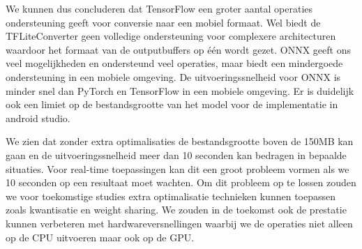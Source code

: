 We kunnen dus concluderen dat TensorFlow een groter aantal operaties ondersteuning geeft voor conversie naar een mobiel formaat.
Wel biedt de TFLiteConverter geen volledige ondersteuning voor complexere architecturen waardoor het formaat van de outputbuffers op \'e\'en wordt gezet.
ONNX geeft ons veel mogelijkheden en ondersteund veel operaties, maar biedt een mindergoede ondersteuning in een mobiele omgeving.
De uitvoeringssnelheid voor ONNX is minder snel dan PyTorch en TensorFlow in een mobiele omgeving.
Er is duidelijk ook een limiet op de bestandsgrootte van het model voor de implementatie in android studio.

We zien dat zonder extra optimalisaties de bestandsgrootte boven de 150MB kan gaan en de uitvoeringssnelheid meer dan 10 seconden kan bedragen in bepaalde situaties.
Voor real-time toepassingen kan dit een groot probleem vormen als we 10 seconden op een resultaat moet wachten.
Om dit probleem op te lossen zouden we voor toekomstige studies extra optimalisatie technieken kunnen toepassen zoals kwantisatie en weight sharing.
We zouden in de toekomst ook de prestatie kunnen verbeteren met hardwareversnellingen waarbij we de operaties niet alleen op de CPU uitvoeren maar ook op de GPU. 